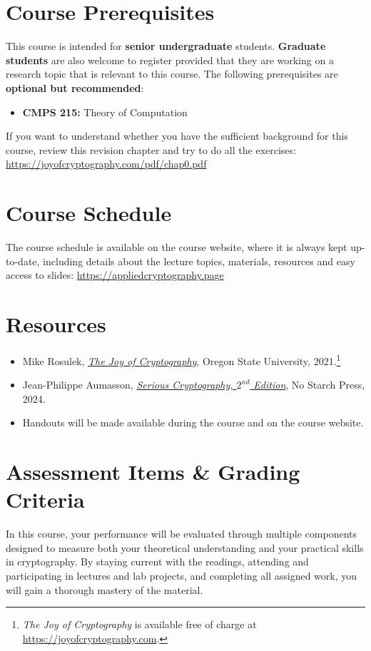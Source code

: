 \documentclass[10pt,a4paper,american]{exam}
\begin{document}
\section{Course Prerequisites}
This course is intended for \textbf{senior undergraduate} students. \textbf{Graduate students} are also welcome to register provided that they are working on a research topic that is relevant to this course. The following prerequisites are \textbf{optional but recommended}:

\begin{itemize}
	\item \textbf{CMPS 215:} Theory of Computation
\end{itemize}

If you want to understand whether you have the sufficient background for this course, review this revision chapter and try to do all the exercises: \url{https://joyofcryptography.com/pdf/chap0.pdf}

\section{Course Schedule}
The course schedule is available on the course website, where it is always kept up-to-date, including details about the lecture topics, materials, resources and easy access to slides: \url{https://appliedcryptography.page}

\section{Resources}
\begin{itemize}
	\item Mike Rosulek, {\href{https://joyofcryptography.com}{\textit{The Joy of Cryptography}}}, Oregon State University, 2021.\footnote{\textit{The Joy of Cryptography} is available free of charge at \url{https://joyofcryptography.com}.}
	\item Jean-Philippe Aumasson, {\href{https://nostarch.com/serious-cryptography-2nd-edition}{\textit{Serious Cryptography, $2^{nd}$ Edition}}}, No Starch Press, 2024.
	\item Handouts will be made available during the course and on the course website.
\end{itemize}

\section{Assessment Items \& Grading Criteria}
In this course, your performance will be evaluated through multiple components designed to measure both your theoretical understanding and your practical skills in cryptography. By staying current with the readings, attending and participating in lectures and lab projects, and completing all assigned work, you will gain a thorough mastery of the material.
\end{document}
